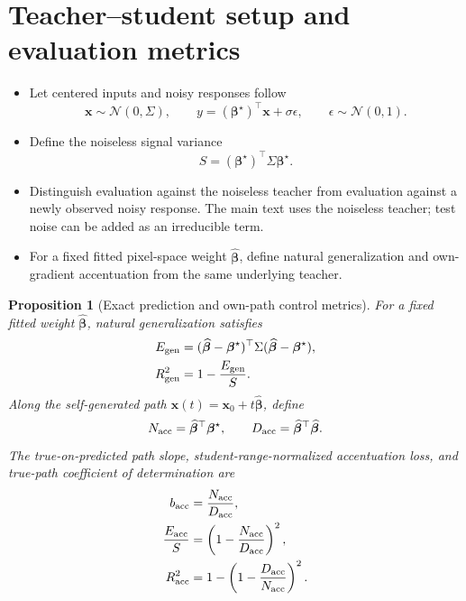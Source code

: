 \documentclass[11pt]{article}
\newtheorem{proposition}[theorem]{Proposition}
\newcommand{\bhat}{\widehat{\bm\beta}}
\newcommand{\bstar}{\bm\beta^{\star}}
\begin{document}
\section{Teacher--student setup and evaluation metrics}
\label{sec:setup}

\begin{itemize}
  \item Let centered inputs and noisy responses follow
  \begin{equation}
    \bm x\sim\mathcal N(0,\Sigma),\qquad
    y=(\bstar)^{\top}\bm x+\sigma\epsilon,
    \qquad \epsilon\sim\mathcal N(0,1).
    \label{eq:teacher}
  \end{equation}
  \item Define the noiseless signal variance
  \begin{equation}
    S=(\bstar)^{\top}\Sigma\bstar.
  \end{equation}
  \item Distinguish evaluation against the noiseless teacher from evaluation
        against a newly observed noisy response. The main text uses the
        noiseless teacher; test noise can be added as an irreducible term.
  \item For a fixed fitted pixel-space weight $\bhat$, define natural
        generalization and own-gradient accentuation from the same underlying
        teacher.
\end{itemize}

\begin{proposition}[Exact prediction and own-path control metrics]
\label{prop:exact-metrics}
For a fixed fitted weight $\bhat$, natural generalization satisfies
\begin{align}
  E_{\rm gen}
    &=(\bhat-\bstar)^{\top}\Sigma(\bhat-\bstar),\label{eq:egen-exact}\\
  R_{\rm gen}^{2}
    &=1-\frac{E_{\rm gen}}{S}.\label{eq:rgen-exact}
\end{align}
Along the self-generated path $\bm x(t)=\bm x_0+t\bhat$, define
\begin{equation}
  N_{\rm acc}=\bhat^{\top}\bstar,
  \qquad
  D_{\rm acc}=\bhat^{\top}\bhat.
\end{equation}
The true-on-predicted path slope, student-range-normalized accentuation loss,
and true-path coefficient of determination are
\begin{align}
  b_{\rm acc}
    &=\frac{N_{\rm acc}}{D_{\rm acc}},\label{eq:bacc-exact}\\
  \frac{E_{\rm acc}}{S}
    &=\left(1-\frac{N_{\rm acc}}{D_{\rm acc}}\right)^2,\label{eq:eacc-exact}\\
  R_{\rm acc}^{2}
    &=1-\left(1-\frac{D_{\rm acc}}{N_{\rm acc}}\right)^2.\label{eq:racc-exact}
\end{align}
\end{proposition}
\end{document}
